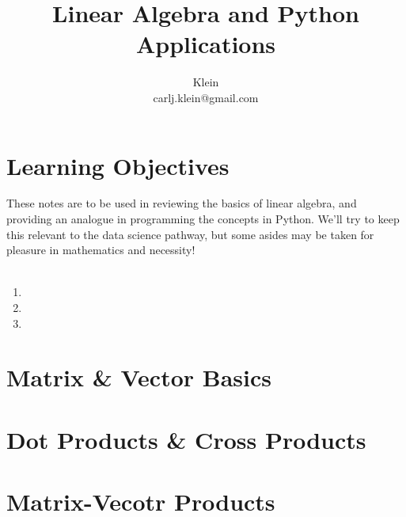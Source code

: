 \documentclass{article}
\begin{document}
	\title{Linear Algebra and Python Applications}
	\author{Klein \\ carlj.klein@gmail.com}
	\date{}
	\maketitle

\section{Learning Objectives}
These notes are to be used in reviewing the basics of linear algebra, and providing an analogue in programming the concepts in Python. We'll try to keep this relevant to the data science pathway, but some asides may be taken for pleasure in mathematics and necessity!
\\\\

\begin{enumerate}
	\item {}
	\item {}
	\item {}
\end{enumerate}

\section{Matrix \& Vector Basics}\label{sec:concept1}

\section{Dot Products \& Cross Products}\label{sec:concept2}

\section{Matrix-Vecotr Products}\label{sec:concept3}
\end{document}
